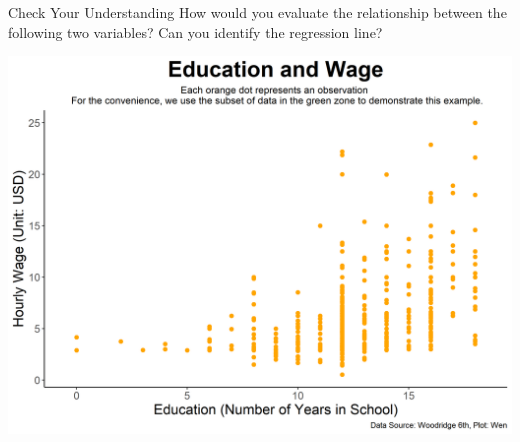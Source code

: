 \documentclass{beamer}
\begin{document}
\begin{frame}{Check Your Understanding}
\vspace{0.2 cm}
How would you evaluate the relationship between the following two variables? Can you identify the regression line? 

\begin{center}
\includegraphics[scale=0.45]{images/plotCorrelations.png}
\end{center}

\end{frame}
\end{document}
